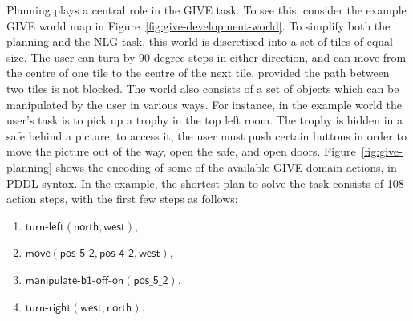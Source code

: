 \documentclass[letterpaper]{article}
\begin{document}
Planning plays a central role in the GIVE task. To see this, consider
the example GIVE world map in
Figure~\ref{fig:give-development-world}. To simplify both the planning
and the NLG task, this world is discretised into a set of tiles of
equal size.  The user can turn by 90 degree steps in either direction,
and can move from the centre of one tile to the centre of the next
tile, provided the path between two tiles is not blocked. The world
also consists of a set of objects which can be manipulated by the user
in various ways. For instance, in the example world the user's task is
to pick up a trophy in the top left room. The trophy is hidden in a
safe behind a picture; to access it, the user must push certain
buttons in order to move the picture out of the way, open the safe,
and open doors. Figure~\ref{fig:give-planning} shows the encoding of
some of the available GIVE domain actions, in PDDL syntax. In the
example, the shortest plan to solve the task consists of 108 action
steps, with the first few steps as follows:
%
\begin{enumerate}
\item $\mathsf{turn}\textsf{-}\mathsf{left}(\mathsf{north},
\mathsf{west})$,
\item $\mathsf{move}(\mathsf{pos\_5\_2}, \mathsf{pos\_4\_2}, \mathsf{west})$,
\item $\mathsf{manipulate}\textsf{-}\mathsf{b1}\textsf{-}\mathsf{off}\textsf{-}\mathsf{on}(\mathsf{pos\_5\_2})$,
\item $\mathsf{turn}\textsf{-}\mathsf{right}(\mathsf{west}, \mathsf{north})$.
\end{enumerate}
\end{document}
